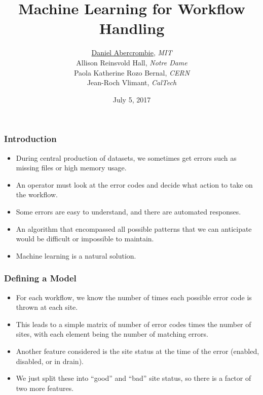 \documentclass{beamer}
\author[Workflow Team]{
  \underline{Daniel Abercrombie}, \emph{MIT} \\
  Allison Reinsvold Hall, \emph{Notre Dame} \\
  Paola Katherine Rozo Bernal, \emph{CERN} \\
  Jean-Roch Vlimant, \emph{CalTech}
}
\title{\bf \sffamily Machine Learning for Workflow Handling}
\date{July 5, 2017}
\begin{document}
\begin{frame}[nonumbering]
  \titlepage
\end{frame}

\begin{frame}
  \frametitle{Introduction}

  \begin{itemize}
  \item During central production of datasets,
    we sometimes get errors such as
    missing files or high memory usage.
  \item An operator must look at the error codes and decide what action to take on the workflow.
  \item Some errors are easy to understand, and there are automated responses.
  \item An algorithm that encompassed all possible patterns that we can anticipate
    would be difficult or impossible to maintain.
  \item Machine learning is a natural solution.
  \end{itemize}

\end{frame}

\begin{frame}
  \frametitle{Defining a Model}

  \begin{itemize}
  \item For each workflow,
    we know the number of times each possible error code is thrown at each site.
  \item This leads to a simple matrix of number of error codes times the number of sites,
    with each element being the number of matching errors.
  \item Another feature considered is the site status at the time of the error
    (enabled, disabled, or in drain).
  \item We just split these into ``good'' and ``bad'' site status,
    so there is a factor of two more features.
  \end{itemize}

\end{frame}
\end{document}

